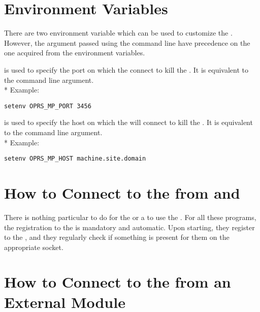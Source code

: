 \section{\MPK{} Environment Variables}

There are two environment variable which can be used to customize the
\MPK{}. However, the  argument passed using the command line
have precedence on the one acquired from the environment variables.

\begin{description}

\item[\code{OPRS\_MP\_PORT}] is used  to specify the port on which the \MPK{}
connect to kill the \MPA{}. It is equivalent to the  command line
argument.\\* 
Example:
\begin{verbatim}
setenv OPRS_MP_PORT 3456
\end{verbatim}

\item[\code{OPRS\_MP\_HOST}] is used  to specify the host on which the \MPK{} will
connect to kill the \MPA{}. It is equivalent to the  command line argument.\\* 
Example:
\begin{verbatim}
setenv OPRS_MP_HOST machine.site.domain
\end{verbatim}

\end{description}

\section{How to Connect to the \MPA{} from \OPRSS{} and \CPK{}}

There is nothing particular to do for the \OPRSS{} or a \CPK{} to use the
\MPA{}. For all these programs, the registration to the \MPA{} is mandatory and
automatic. Upon starting, they register to the \MPA{}, and they regularly check
if something is present for them on the appropriate socket.

\section{How to Connect to the \MPA{} from an External Module}

